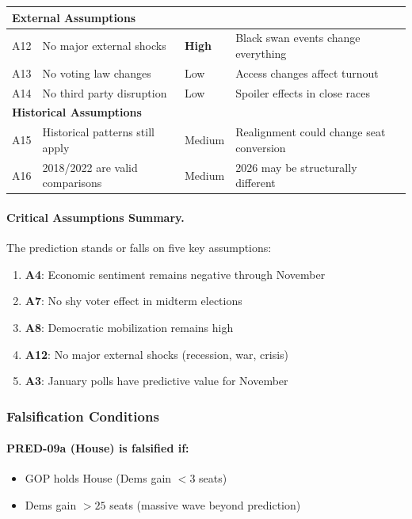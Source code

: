 \begin{longtable}{p{1.2cm}p{5.5cm}p{2cm}p{4.5cm}}
\multicolumn{4}{l}{\textbf{External Assumptions}} \\
\midrule
A12 & No major external shocks & \textbf{High} & Black swan events change everything \\
A13 & No voting law changes & Low & Access changes affect turnout \\
A14 & No third party disruption & Low & Spoiler effects in close races \\
\midrule

\multicolumn{4}{l}{\textbf{Historical Assumptions}} \\
\midrule
A15 & Historical patterns still apply & Medium & Realignment could change seat conversion \\
A16 & 2018/2022 are valid comparisons & Medium & 2026 may be structurally different \\

\end{longtable}

\paragraph{Critical Assumptions Summary.}
The prediction stands or falls on five key assumptions:

\begin{enumerate}
    \item \textbf{A4}: Economic sentiment remains negative through November
    \item \textbf{A7}: No shy voter effect in midterm elections
    \item \textbf{A8}: Democratic mobilization remains high
    \item \textbf{A12}: No major external shocks (recession, war, crisis)
    \item \textbf{A3}: January polls have predictive value for November
\end{enumerate}

\subsubsection{Falsification Conditions}

\paragraph{PRED-09a (House) is falsified if:}
\begin{itemize}
    \item GOP holds House (Dems gain $<3$ seats)
    \item Dems gain $>25$ seats (massive wave beyond prediction)
\end{itemize}

